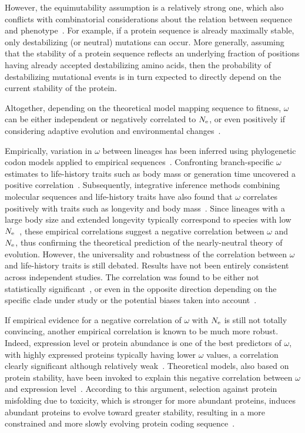 \documentclass[authoryear]{elsarticle} %
\begin{document}
However, the equimutability assumption is a relatively strong one, which also conflicts with combinatorial considerations about the relation between sequence and phenotype~\citep{Serohijos2012}.
For example, if a protein sequence is already maximally stable, only destabilizing (or neutral) mutations can occur.
More generally, assuming that the stability of a protein sequence reflects an underlying fraction of positions having already accepted destabilizing amino acids, then the probability of destabilizing mutational events is in turn expected to directly depend on the current stability of the protein.

Altogether, depending on the theoretical model mapping sequence to fitness, $\omega$ can be either independent or negatively correlated to $N_{\text{e}}$, or even positively if considering adaptive evolution and environmental changes~\citep{Lanfear2014}.

Empirically, variation in $\omega$ between lineages has been inferred using phylogenetic {codon} models applied to empirical sequences~\citep{Yang1998,Zhang2004}.
Confronting branch-specific $\omega$ estimates to life-history traits such as body mass or generation time uncovered a positive correlation~\citep{Popadin2007, Nikolaev2007}.
Subsequently, integrative inference methods combining molecular sequences and life-history traits have also found that $\omega$ correlates positively with traits such as longevity and body mass~\citep{Lartillot2011, Figuet2017}.
Since lineages with a large body size and extended longevity typically correspond to species with low $N_{\text{e}}$~\citep{Romiguier2014}, these empirical correlations suggest a negative correlation between $\omega$ and $N_{\text{e}}$, thus confirming the theoretical prediction of the {nearly-neutral} theory of evolution.
However, the universality and robustness of the correlation between $\omega$ and life-history traits is still debated.
Results have not been entirely consistent across independent studies. The correlation was found to be either not statistically significant~\citep{Lartillot2012}, or even in the opposite direction depending on the specific clade under study or the potential biases taken into account~\citep{Lanfear2010, Nabholz2013, Lanfear2014, Figuet2016}.

If empirical evidence for a negative correlation of $\omega$ with $N_{\text{e}}$ is still not totally convincing, another empirical correlation is known to be much more robust.
Indeed, expression level or protein abundance is one of the best predictors of $\omega$, with highly expressed proteins typically having lower $\omega$ values, a correlation clearly significant although relatively weak~\citep{Duret2000, Rocha2004, Drummond2005a, Zhang2015, Song2017}.
Theoretical models, also based on protein stability, have been invoked to explain this negative correlation between $\omega$ and expression level~\citep{Wilke2006, Drummond2008}.
According to this argument, selection against protein misfolding due to toxicity, which is stronger for more abundant proteins, induces abundant proteins to evolve toward greater stability, resulting in a more constrained and more slowly evolving protein coding sequence~\citep{Serohijos2012}.
\end{document}
